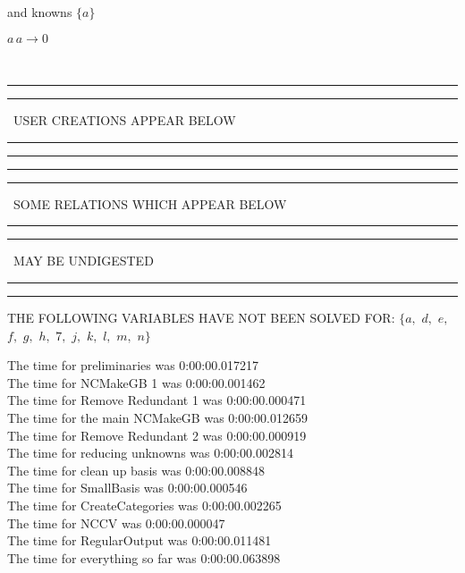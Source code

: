 \documentclass[rep10,leqno]{report}
\begin{document}
and knowns $\{a\}$\smallskip\\
\begin{minipage}{6in}
$
a\,
 a\rightarrow 0
$
\end{minipage}\\
\rule[2pt]{6in}{1pt}\hfil\break
\rule[2.5pt]{1.701in}{1pt}
\ USER CREATIONS APPEAR BELOW\ 
\rule[2.5pt]{1.701in}{1pt}\hfil\break
\rule[2pt]{6in}{1pt}\hfil\break
\rule[2pt]{6in}{4pt}\hfil\break
\rule[2pt]{1.45in}{4pt}
\ SOME RELATIONS WHICH APPEAR BELOW\ 
\rule[2pt]{1.45in}{4pt}\hfil\break
\rule[2pt]{2.18in}{4pt}
\ MAY BE UNDIGESTED\ 
\rule[2pt]{2.18in}{4pt}\hfil\break
\rule[2pt]{6in}{4pt}\hfil\break
THE FOLLOWING VARIABLES HAVE NOT BEEN SOLVED FOR:\hfil\break
$\{a,
$ $
d,
$ $
e,
$ $
f,
$ $
g,
$ $
h,
$ $
7,
$ $
j,
$ $
k,
$ $
l,
$ $
m,
$ $
n\}$
\smallskip\\
\vspace{10pt}

\noindent
The time for preliminaries was 0:00:00.017217\\
The time for NCMakeGB 1 was 0:00:00.001462\\
The time for Remove Redundant 1 was 0:00:00.000471\\
The time for the main NCMakeGB was 0:00:00.012659\\
The time for Remove Redundant 2 was 0:00:00.000919\\
The time for reducing unknowns was 0:00:00.002814\\
The time for clean up basis was 0:00:00.008848\\
The time for SmallBasis was 0:00:00.000546\\
The time for CreateCategories was 0:00:00.002265\\
The time for NCCV was 0:00:00.000047\\
The time for RegularOutput was 0:00:00.011481\\
The time for everything so far was 0:00:00.063898\\
\end{document}
